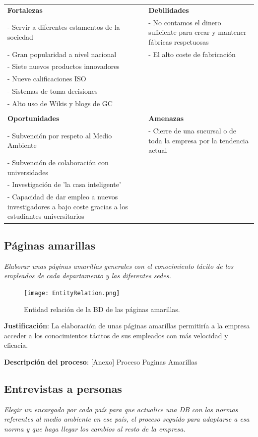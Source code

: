 \documentclass[twoside]{article}
\begin{document}
\begin{table}[ht!]
	\centering
	\begin{tabular}{ p{6cm} | p{6cm} }
		\textbf{Fortalezas} & \textbf{Debilidades}\\
		- Servir a diferentes estamentos de la sociedad & - No contamos el dinero suficiente para crear y mantener fábricas respetuosas \\
		- Gran popularidad a nivel nacional & - El alto coste de fabricación  \\
		- Siete nuevos productos innovadores & \\
		- Nueve calificaciones ISO & \\
		- Sistemas de toma decisiones & \\
		- Alto uso de Wikis y blogs de GC & \\\hline\\
		\textbf{Oportunidades} & \textbf{Amenazas} \\
		- Subvención por respeto al Medio Ambiente & - Cierre de una sucursal o de toda la empresa por la tendencia actual\\
		- Subvención de colaboración con universidades & \\
		- Investigación de 'la casa inteligente' & \\
		- Capacidad de dar empleo a nuevos investigadores a bajo coste gracias a los estudiantes universitarios 
	\end{tabular}
\end{table}


\subsection{Páginas amarillas}
\label{sec:pAmarilla}
\textit{Elaborar unas páginas amarillas generales con el conocimiento tácito de los empleados de cada departamento y las diferentes sedes.}

\begin{figure}[ht!]
	\texttt{[image: EntityRelation.png]}
	\caption{Entidad relación de la BD de las páginas amarillas.}
	\label{fig:entiy relation}
\end{figure}

\textbf{Justificación}: La elaboración de unas páginas amarillas permitiría a la empresa acceder a los conocimientos tácitos de sus empleados con más velocidad y eficacia.

\textbf{Descripción del proceso}: [Anexo] Proceso Paginas Amarillas

\subsection{Entrevistas a personas}
\label{sec:entrevistas}
\textit{Elegir un encargado por cada país para que actualice una DB con las normas referentes al medio ambiente en ese país, el proceso seguido para adaptarse a esa norma y que haga llegar los cambios al resto de la empresa.}
\\
\end{document}
